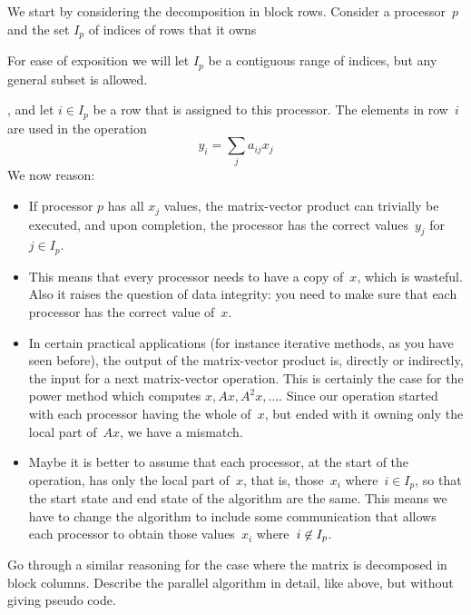 We start by considering the decomposition in block rows. Consider
a processor~$p$ and the set $I_p$ of indices of rows that it
owns
\begin{footnoteenv}
  {For ease of exposition we will let $I_p$ be a contiguous
    range of indices, but any general subset is allowed.}
\end{footnoteenv}%
, and
let $i\in I_p$ be a row that is assigned to this processor. 
The elements in
row~$i$ are used in the operation
\[ y_i=\sum_ja_{ij}x_j \]
We now reason:
\begin{itemize}
\item If processor $p$ has all $x_j$ values, the matrix-vector product
  can trivially be executed, and upon completion, the processor has
  the correct values~$y_j$ for~$j\in I_p$.
\item This means that every processor needs to have a copy of~$x$,
  which is wasteful. Also it raises the question of data integrity:
  you need to make sure that each processor has the correct value
  of~$x$.
\item In certain practical applications (for instance iterative
  methods, as you have seen before), the output of the matrix-vector
  product is, directly or indirectly, the input for a next
  matrix-vector operation. This is certainly the case for the power
  method which computes $x, Ax, A^2x,\ldots$. Since our operation
  started with each processor having the whole of~$x$, but ended with
  it owning only the local part of~$Ax$, we have a mismatch.
\item Maybe it is better to assume that each processor, at the start
  of the operation, has only the local part of~$x$, that is,
  those~$x_i$ where~$i\in I_p$, so that the start state and end state
  of the algorithm are the same. This means we have to change the
  algorithm to include some communication that allows each processor
  to obtain those values~$x_i$ where~$i\not\in\nobreak I_p$.
\end{itemize}

\begin{exercise}
  Go through a similar reasoning for the case where the matrix is
  decomposed in block columns. Describe the parallel algorithm in
  detail, like above, but without giving pseudo code.
\end{exercise}

\def\sublocal{_{\mathrm\scriptstyle local}}%

